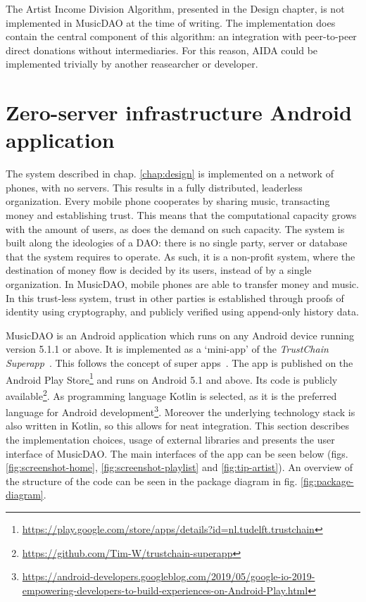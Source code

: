 The Artist Income Division Algorithm, presented in the Design chapter, is not implemented in MusicDAO at the time of writing. The implementation does contain the central component of this algorithm: an integration with peer-to-peer direct donations without intermediaries. For this reason, AIDA could be implemented trivially by another reasearcher or developer.

\section{Zero-server infrastructure Android application}
The system described in chap. \ref{chap:design} is implemented on a network of phones, with no servers. This results in a fully distributed, leaderless organization. Every mobile phone cooperates by sharing music, transacting money and establishing trust. This means that the computational capacity grows with the amount of users, as does the demand on such capacity. The system is built along the ideologies of a DAO: there is no single party, server or database that the system requires to operate. As such, it is a non-profit system, where the destination of money flow is decided by its users, instead of by a single organization. In MusicDAO, mobile phones are able to transfer money and music. In this trust-less system, trust in other parties is established through proofs of identity using cryptography, and publicly verified using append-only history data.

MusicDAO is an Android application which runs on any Android device running version 5.1.1 or above. It is implemented as a `mini-app' of the \textit{TrustChain Superapp}~\citep{mattskala2020}. This follows the concept of super apps~\citep{kpmg2019superapps}. The app is published on the Android Play Store\footnote{\url{https://play.google.com/store/apps/details?id=nl.tudelft.trustchain}} and runs on Android 5.1 and above. Its code is publicly available\footnote{\url{https://github.com/Tim-W/trustchain-superapp}}. As programming language Kotlin is selected, as it is the preferred language for Android development\footnote{\url{https://android-developers.googleblog.com/2019/05/google-io-2019-empowering-developers-to-build-experiences-on-Android-Play.html}}. Moreover the underlying technology stack is also written in Kotlin, so this allows for neat integration. This section describes the implementation choices, usage of external libraries and presents the user interface of MusicDAO. The main interfaces of the app can be seen below (figs. \ref{fig:screenshot-home}, \ref{fig:screenshot-playlist} and \ref{fig:tip-artist}). An overview of the structure of the code can be seen in the package diagram in fig. \ref{fig:package-diagram}.

